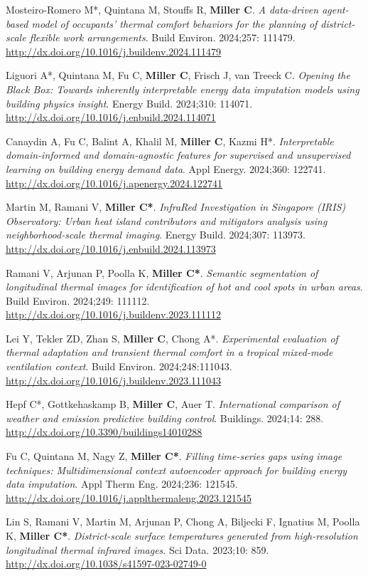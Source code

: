 \documentclass[10pt,a4paper]{article}
\begin{document}
\begin{small}
\begin{etaremune}
\item
Mosteiro-Romero M*, Quintana M, Stouffs R, \textbf{Miller C}. \emph{A data-driven agent-based model of occupants’ thermal comfort behaviors for the planning of district-scale flexible work arrangements}. Build Environ. 2024;257: 111479. \url{http://dx.doi.org/10.1016/j.buildenv.2024.111479}
\item
Liguori A*, Quintana M, Fu C, \textbf{Miller C}, Frisch J, van Treeck C. \emph{Opening the Black Box: Towards inherently interpretable energy data imputation models using building physics insight}. Energy Build. 2024;310: 114071. \url{http://dx.doi.org/10.1016/j.enbuild.2024.114071}
\item
Canaydin A, Fu C, Balint A, Khalil M, \textbf{Miller C}, Kazmi H*. \emph{Interpretable domain-informed and domain-agnostic features for supervised and unsupervised learning on building energy demand data}. Appl Energy. 2024;360: 122741. \url{http://dx.doi.org/10.1016/j.apenergy.2024.122741}
\item
Martin M, Ramani V, \textbf{Miller C*}. \emph{InfraRed Investigation in Singapore (IRIS) Observatory: Urban heat island contributors and mitigators analysis using neighborhood-scale thermal imaging}. Energy Build. 2024;307: 113973. \url{http://dx.doi.org/10.1016/j.enbuild.2024.113973}
\item
Ramani V, Arjunan P, Poolla K, \textbf{Miller C*}. \emph{Semantic segmentation of longitudinal thermal images for identification of hot and cool spots in urban areas}. Build Environ. 2024;249: 111112. \url{http://dx.doi.org/10.1016/j.buildenv.2023.111112}
\item
Lei Y, Tekler ZD, Zhan S, \textbf{Miller C}, Chong A*. \emph{Experimental evaluation of thermal adaptation and transient thermal comfort in a tropical mixed-mode ventilation context}. Build Environ. 2024;248:111043. \url{http://dx.doi.org/10.1016/j.buildenv.2023.111043}
\item
Hepf C*, Gottkehaskamp B, \textbf{Miller C}, Auer T. \emph{International comparison of weather and emission predictive building control}. Buildings. 2024;14: 288. \url{http://dx.doi.org/10.3390/buildings14010288}
\item
Fu C, Quintana M, Nagy Z, \textbf{Miller C*}. \emph{Filling time-series gaps using image techniques: Multidimensional context autoencoder approach for building energy data imputation}. Appl Therm Eng. 2024;236: 121545. \url{http://dx.doi.org/10.1016/j.applthermaleng.2023.121545}
\item
Lin S, Ramani V, Martin M, Arjunan P, Chong A, Biljecki F, Ignatius M, Poolla K, \textbf{Miller C*}. \emph{District-scale surface temperatures generated from high-resolution longitudinal thermal infrared images}. Sci Data. 2023;10: 859. \url{http://dx.doi.org/10.1038/s41597-023-02749-0}

\end{etaremune}
\end{small}
\end{document}

